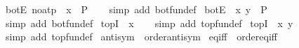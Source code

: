 \begin{isabellebody}
\isanewline
{}\isamarkupfalse%
\ bot{}E\ {\isacharbrackleft}{\kern0pt}no{\isacharunderscore}{\kern0pt}atp{\isacharbrackright}{\kern0pt}{\isacharcolon}{\kern0pt}\ {\isachardoublequoteopen}{\isasymbottom}\ x\ {\isasymLongrightarrow}\ P{\isachardoublequoteclose}\isanewline
%
\isadelimproof
\ \ %
\endisadelimproof
%
\isatagproof
{}\isamarkupfalse%
\ {\isacharparenleft}{\kern0pt}simp\ add{\isacharcolon}{\kern0pt}\ bot{\isacharunderscore}{\kern0pt}fun{\isacharunderscore}{\kern0pt}def{\isacharparenright}{\kern0pt}%
\endisatagproof
{\isafoldproof}%
%
\isadelimproof
\isanewline
%
\endisadelimproof
\isanewline
{}\isamarkupfalse%
\ bot{}E{\isacharcolon}{\kern0pt}\ {\isachardoublequoteopen}{\isasymbottom}\ x\ y\ {\isasymLongrightarrow}\ P{\isachardoublequoteclose}\isanewline
%
\isadelimproof
\ \ %
\endisadelimproof
%
\isatagproof
{}\isamarkupfalse%
\ {\isacharparenleft}{\kern0pt}simp\ add{\isacharcolon}{\kern0pt}\ bot{\isacharunderscore}{\kern0pt}fun{\isacharunderscore}{\kern0pt}def{\isacharparenright}{\kern0pt}%
\endisatagproof
{\isafoldproof}%
%
\isadelimproof
\isanewline
%
\endisadelimproof
\isanewline
{}\isamarkupfalse%
\ top{}I{\isacharcolon}{\kern0pt}\ {\isachardoublequoteopen}{\isasymtop}\ x{\isachardoublequoteclose}\isanewline
%
\isadelimproof
\ \ %
\endisadelimproof
%
\isatagproof
{}\isamarkupfalse%
\ {\isacharparenleft}{\kern0pt}simp\ add{\isacharcolon}{\kern0pt}\ top{\isacharunderscore}{\kern0pt}fun{\isacharunderscore}{\kern0pt}def{\isacharparenright}{\kern0pt}%
\endisatagproof
{\isafoldproof}%
%
\isadelimproof
\isanewline
%
\endisadelimproof
\isanewline
{}\isamarkupfalse%
\ top{}I{\isacharcolon}{\kern0pt}\ {\isachardoublequoteopen}{\isasymtop}\ x\ y{\isachardoublequoteclose}\isanewline
%
\isadelimproof
\ \ %
\endisadelimproof
%
\isatagproof
{}\isamarkupfalse%
\ {\isacharparenleft}{\kern0pt}simp\ add{\isacharcolon}{\kern0pt}\ top{\isacharunderscore}{\kern0pt}fun{\isacharunderscore}{\kern0pt}def{\isacharparenright}{\kern0pt}%
\endisatagproof
{\isafoldproof}%
%
\isadelimproof
%
\endisadelimproof
%
\isadelimdocument
%
\endisadelimdocument
%
\isatagdocument
%
\isamarkuptrue%
%
\endisatagdocument
{\isafolddocument}%
%
\isadelimdocument
%
\endisadelimdocument
{}\isamarkupfalse%
\ antisym\ {\isacharequal}{\kern0pt}\ order{\isachardot}{\kern0pt}antisym\isanewline
{}\isamarkupfalse%
\ eq{\isacharunderscore}{\kern0pt}iff\ {\isacharequal}{\kern0pt}\ order{\isachardot}{\kern0pt}eq{\isacharunderscore}{\kern0pt}iff\isanewline

\end{isabellebody}
